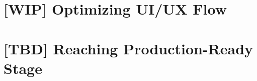 \documentclass[12pt, a4paper, twoside]{extreport}
\begin{document}
\newpage
\section{[WIP] Optimizing UI/UX Flow}


\newpage
\section{[TBD] Reaching Production-Ready Stage}




\thispagestyle{empty}



~
\end{document}
